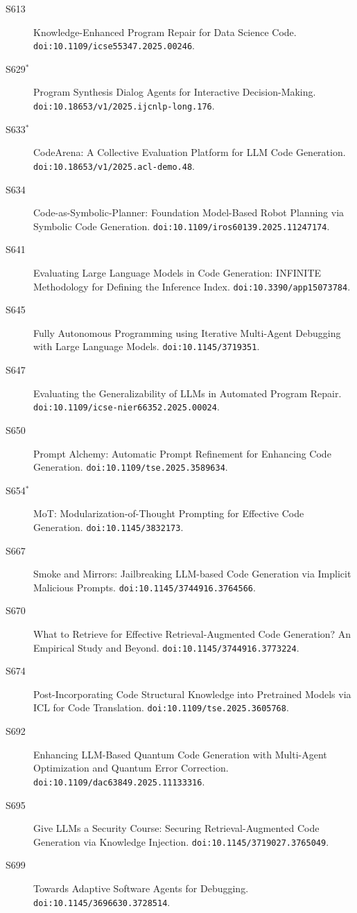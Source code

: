 {\begin{description}
\item[S613] Knowledge-Enhanced Program Repair for Data Science Code. \texttt{doi:10.1109/icse55347.2025.00246}.
\item[S629$^\ast$] Program Synthesis Dialog Agents for Interactive Decision-Making. \texttt{doi:10.18653/v1/2025.ijcnlp-long.176}.
\item[S633$^\ast$] CodeArena: A Collective Evaluation Platform for LLM Code Generation. \texttt{doi:10.18653/v1/2025.acl-demo.48}.
\item[S634] Code-as-Symbolic-Planner: Foundation Model-Based Robot Planning via Symbolic Code Generation. \texttt{doi:10.1109/iros60139.2025.11247174}.
\item[S641] Evaluating Large Language Models in Code Generation: INFINITE Methodology for Defining the Inference Index. \texttt{doi:10.3390/app15073784}.
\item[S645] Fully Autonomous Programming using Iterative Multi-Agent Debugging with Large Language Models. \texttt{doi:10.1145/3719351}.
\item[S647] Evaluating the Generalizability of LLMs in Automated Program Repair. \texttt{doi:10.1109/icse-nier66352.2025.00024}.
\item[S650] Prompt Alchemy: Automatic Prompt Refinement for Enhancing Code Generation. \texttt{doi:10.1109/tse.2025.3589634}.
\item[S654$^\ast$] MoT: Modularization-of-Thought Prompting for Effective Code Generation. \texttt{doi:10.1145/3832173}.
\item[S667] Smoke and Mirrors: Jailbreaking LLM-based Code Generation via Implicit Malicious Prompts. \texttt{doi:10.1145/3744916.3764566}.
\item[S670] What to Retrieve for Effective Retrieval-Augmented Code Generation? An Empirical Study and Beyond. \texttt{doi:10.1145/3744916.3773224}.
\item[S674] Post-Incorporating Code Structural Knowledge into Pretrained Models via ICL for Code Translation. \texttt{doi:10.1109/tse.2025.3605768}.
\item[S692] Enhancing LLM-Based Quantum Code Generation with Multi-Agent Optimization and Quantum Error Correction. \texttt{doi:10.1109/dac63849.2025.11133316}.
\item[S695] Give LLMs a Security Course: Securing Retrieval-Augmented Code Generation via Knowledge Injection. \texttt{doi:10.1145/3719027.3765049}.
\item[S699] Towards Adaptive Software Agents for Debugging. \texttt{doi:10.1145/3696630.3728514}.

\end{description}}
